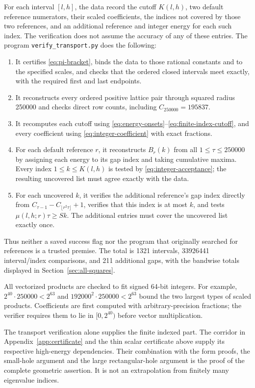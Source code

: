 \documentclass[11pt,reqno]{amsart}
\numberwithin{equation}{section}
\begin{document}
For each interval $[l,h]$, the data record the cutoff
$K(l,h)$, two default reference numerators, their scaled
coefficients, the indices not covered by those two
references, and an additional reference and integer
energy for each such index. The verification does not
assume the accuracy of any of these entries. The
program \texttt{verify\_transport.py} does the following:
\begin{enumerate}
\item It certifies \eqref{eq:pi-bracket}, binds the
data to those rational constants and to the specified
scales, and checks that the ordered closed intervals
meet exactly, with the required first and last endpoints.
\item It reconstructs every ordered positive lattice
pair through squared radius 250000 and checks direct
row counts, including $C_{250000}=195837$.
\item It recomputes each cutoff using
\eqref{eq:energy-onsets}--\eqref{eq:finite-index-cutoff},
and every coefficient using
\eqref{eq:integer-coefficient} with exact fractions.
\item For each default reference $r$, it reconstructs
$B_r(k)$ from all $1\le\tau\le250000$ by assigning
each energy to its gap index and taking cumulative
maxima. Every index $1\le k\le K(l,h)$ is tested by
\eqref{eq:integer-acceptance}; the resulting uncovered
list must agree exactly with the data.
\item For each uncovered $k$, it verifies the additional
reference's gap index directly from
$C_{\tau-1}-C_{\lfloor r^2\tau\rfloor}+1$, verifies
that this index is at most $k$, and tests
$\mu(l,h;r)\tau\ge Sk$. The additional entries must
cover the uncovered list exactly once.
\end{enumerate}
Thus neither a saved success flag nor the program that
originally searched for references is a trusted premise.
The total is 1321 intervals, 33926441 interval/index
comparisons, and 211 additional gaps, with the bandwise
totals displayed in Section~\ref{sec:all-squares}.

All vectorized products are checked to fit signed
64-bit integers. For example,
$2^{40}\cdot250000<2^{63}$ and
$192000^2\cdot250000<2^{63}$ bound the two largest
types of scaled products. Coefficients are first
computed with arbitrary-precision fractions; the
verifier requires them to lie in $[0,2^{40})$ before
vector multiplication.

The transport verification alone supplies the finite
indexed part. The corridor in
Appendix~\ref{app:certificate} and the thin scalar
certificate above supply its respective high-energy
dependencies. Their combination with the form proofs,
the small-hole argument and the large rectangular-hole
argument is the proof of the complete geometric
assertion. It is not an extrapolation from finitely
many eigenvalue indices.
\end{document}
